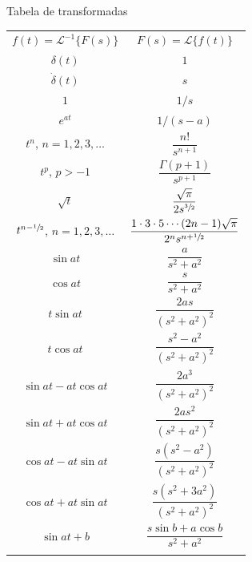 \begin{frame}[allowframebreaks]{Tabela de transformadas}
\begin{longtable}{cc}
	$ f(t)=\mathscr{L}^{-1}\{F(s)\} $ & $ F(s)=\mathscr{L}\{f(t)\} $\\\addlinespace\toprule\addlinespace
	$\delta (t)$ & $ 1 $
	\\\addlinespace\midrule\addlinespace[0.2cm]
	$\dot{\delta}(t)$ & $s$
	\\\addlinespace\midrule\addlinespace[0.2cm]
	$ 1 $ & $ 1/s $ \\\addlinespace\midrule\addlinespace[0.2cm]
	$ e^{at} $ & $ 1/(s-a) $\\\addlinespace\midrule\addlinespace[0.2cm]
	$ t^{n} $, $ n=1,2,3,\ldots $ & $ \dfrac{n!}{s^{n+1}} $\\\addlinespace\midrule\addlinespace[0.2cm]
	$ t^{p} $, $ p>-1 $ & $ \dfrac{\Gamma \left(p + 1\right)}{s^{p + 1}} $\\\addlinespace\midrule\addlinespace[0.2cm]
	$ \sqrt{t} $ & $ \dfrac{\sqrt{\pi}}{2s^{\sfrac{3}{2}}} $\\\addlinespace\midrule\addlinespace[0.2cm]
	$ t^{n-\sfrac{1}{2}} $, $ n=1,2,3,\ldots $ & $ \dfrac{1\cdot3\cdot5\cdots(2n-1)\sqrt{\pi}}{2^{n}s^{n+\sfrac{1}{2}}} $
	\\\addlinespace\midrule\addlinespace[0.2cm]
	$ \sin{at} $ & $ \dfrac{a}{s^{2}+a^{2}} $\\\addlinespace\midrule\addlinespace[0.2cm]
	$ \cos{at} $ & $ \dfrac{s}{s^{2}+a^{2}} $\\\addlinespace\midrule\addlinespace[0.2cm]
	$ t\sin{at} $ & $ \dfrac{2as}{\left(s^{2}+a^{2}\right)^{2}} $\\\addlinespace\midrule\addlinespace[0.2cm]
	$ t\cos{at} $ & $ \dfrac{s^{2}-a^{2}}{\left(s^{2}+a^{2}\right)^{2}} $\\\addlinespace\midrule\addlinespace[0.2cm]
	$ \sin{at}-at\cos{at} $ & $ \dfrac{2a^{3}}{\left(s^{2}+a^{2}\right)^{2}} $\\\addlinespace\midrule\addlinespace[0.2cm]
	$ \sin{at}+at\cos{at} $ & $ \dfrac{2as^{2}}{\left(s^{2}+a^{2}\right)^{2}} $
	\\\addlinespace\midrule\addlinespace[0.2cm]
	$ \cos{at}-at\sin{at} $ & $ \dfrac{s\left(s^{2}-a^{2}\right)}{\left(s^{2}+a^{2}\right)^{2}} $\\\addlinespace\midrule\addlinespace[0.2cm]
	$ \cos{at}+at\sin{at} $ & $ \dfrac{s\left(s^{2}+3a^{2}\right)}{\left(s^{2}+a^{2}\right)^{2}} $\\\addlinespace\midrule\addlinespace[0.2cm]
	$ \sin{at+b} $ & $ \dfrac{s\sin{b}+a\cos{b}}{s^{2}+a^{2}} $\\\addlinespace\midrule\addlinespace[0.2cm]

\end{longtable}
\end{frame}
